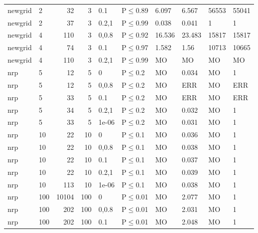 \begin{longtable}{llrrllllll}
 newgrid       & 2        &     	32 &   3 & 0.1   & P$\leq$0.89  & 6.097    & 6.567    & 56553   & 55041  \\
 newgrid       & 2        &     	37 &   3 & 0.2,1 & P$\leq$0.99  & 0.038    & 0.041    & 1       & 1      \\
 newgrid       & 4        &    	110 &   3 & 0,0.8 & P$\leq$0.92  & 16.536   & 23.483   & 15817   & 15817  \\
 newgrid       & 4        &     	74 &   3 & 0.1   & P$\leq$0.97  & 1.582    & 1.56     & 10713   & 10665  \\
 newgrid       & 4        &    	110 &   3 & 0.2,1 & P$\leq$0.99  & MO       & MO       & MO      & MO     \\
 nrp           & 5        &     	12 &   5 & 0     & P$\leq$0.2   & MO       & 0.034    & MO      & 1      \\
 nrp           & 5        &     	12 &   5 & 0,0.8 & P$\leq$0.2   & MO       & ERR      & MO      & ERR    \\
 nrp           & 5        &     	33 &   5 & 0.1   & P$\leq$0.2   & MO       & ERR      & MO      & ERR    \\
 nrp           & 5        &     	34 &   5 & 0.2,1 & P$\leq$0.2   & MO       & 0.032    & MO      & 1      \\
 nrp           & 5        &     	33 &   5 & 1e-06 & P$\leq$0.2   & MO       & 0.031    & MO      & 1      \\
 nrp           & 10       &     	22 &  10 & 0     & P$\leq$0.1   & MO       & 0.036    & MO      & 1      \\
 nrp           & 10       &     	22 &  10 & 0,0.8 & P$\leq$0.1   & MO       & 0.038    & MO      & 1      \\
 nrp           & 10       &     	22 &  10 & 0.1   & P$\leq$0.1   & MO       & 0.037    & MO      & 1      \\
 nrp           & 10       &     	22 &  10 & 0.2,1 & P$\leq$0.1   & MO       & 0.039    & MO      & 1      \\
 nrp           & 10       &    	113 &  10 & 1e-06 & P$\leq$0.1   & MO       & 0.038    & MO      & 1      \\
 nrp           & 100      &  	10104 & 100 & 0     & P$\leq$0.01  & MO       & 2.077    & MO      & 1      \\
 nrp           & 100      &    	202 & 100 & 0,0.8 & P$\leq$0.01  & MO       & 2.031    & MO      & 1      \\
 nrp           & 100      &    	202 & 100 & 0.1   & P$\leq$0.01  & MO       & 2.048    & MO      & 1      \\

\end{longtable}
